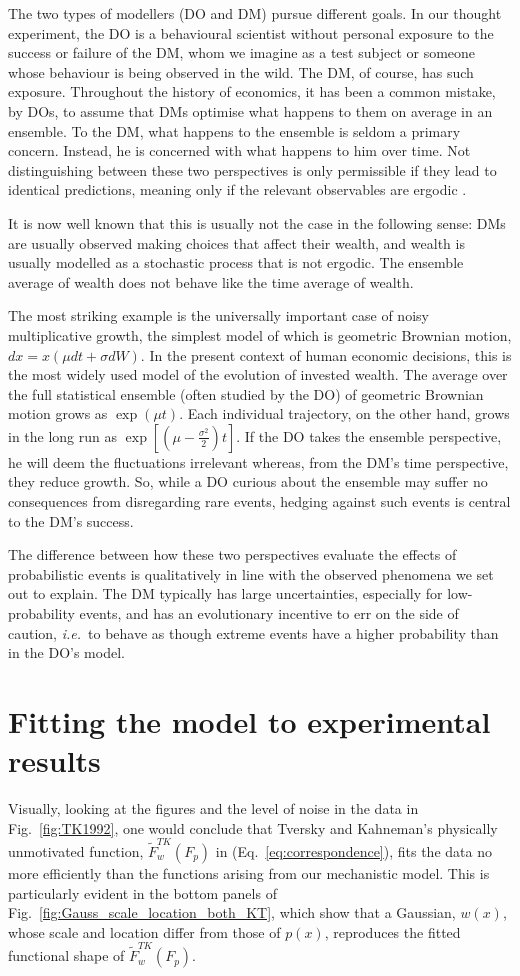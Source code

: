 \documentclass[a4paper, 12pt]{article}
\newcommand{\eref}[1]{(Eq.~\ref{eq:#1})}
\newcommand{\fref}[1]{Fig.~\ref{fig:#1}}
\newcommand{\seclabel}[1]{\label{sec:#1}}
\newcommand{\ie}{{\it i.e.}\ }
\begin{document}
The two types of modellers (DO and DM) pursue different goals. In our thought experiment, the DO is a behavioural scientist without personal exposure to the success or failure of the DM, whom we imagine as a test subject or someone whose behaviour is being observed in the wild. The DM, of course, has such exposure. Throughout the history of economics, it has been a common mistake, by DOs, to assume that DMs optimise what happens to them on average in an ensemble. To the DM, what happens to the ensemble is seldom a primary concern. Instead, he is concerned with what happens to him over time. Not distinguishing between these two perspectives is only permissible if they lead to identical predictions, meaning only if the relevant observables are ergodic \citep{Peters2019b}. 

It is now well known that this is usually not the case in the following sense: DMs are usually observed making choices that affect their wealth, and wealth is usually modelled as a stochastic process that is not ergodic. The ensemble average of wealth does not behave like the time average of wealth.

The most striking example is the universally important case of noisy multiplicative growth, the simplest model of which is geometric Brownian motion, $dx=x(\mu dt+\sigma dW)$. In the present context of human economic decisions, this is the most widely used model of the evolution of invested wealth. The average over the full statistical ensemble (often studied by the DO) of geometric Brownian motion grows as $\exp(\mu t)$. Each individual trajectory, on the other hand, grows in the long run as $\exp[(\mu-\frac{\sigma^2}{2})t]$. If the DO takes the ensemble perspective, he will deem the fluctuations irrelevant whereas, from the DM's time perspective, they reduce growth. So, while a DO curious about the ensemble may suffer no consequences from disregarding rare events, hedging against such events is central to the DM's success.

The difference between how these two perspectives evaluate the effects of probabilistic events is qualitatively in line with the observed phenomena we set out to explain. The DM typically has large uncertainties, especially for low-probability events, and has an evolutionary incentive to err on the side of caution, \ie to behave as though extreme events have a higher probability than in the DO's model.

\section{Fitting the model to experimental results \seclabel{Fitting_the}}
Visually, looking at the figures and the level of noise in the data in \fref{TK1992}, one would conclude that Tversky and Kahneman's physically unmotivated function, $\tilde{F}^{TK}_w(F_p)$ in \eref{correspondence}, fits the data no more efficiently than the functions arising from our mechanistic model. This is particularly evident in the bottom panels of \fref{Gauss_scale_location_both_KT}, which show that a Gaussian, $w(x)$, whose scale and location differ from those of $p(x)$, reproduces the fitted functional shape of $\tilde{F}^{TK}_w(F_p)$.
\end{document}
